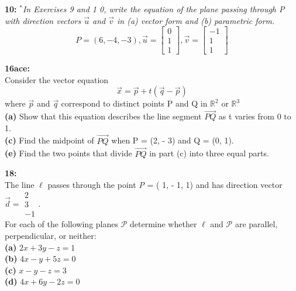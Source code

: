 \documentclass[12pt,letterpaper]{hmcpset}
\begin{document}
\vspace{180pt}
\pagebreak

\begin{problem}
\textbf{10:} \textit{$^*$In Exercises 9 and 1 0, write the equation of the plane passing
through P with direction vectors $\vec{u}$ and $\vec{v}$ in (a) vector
form and (b) parametric form.} \\
\[ P = (6,-4,-3), \vec{u} = \begin{bmatrix} 0\\1\\1 \end{bmatrix}, \vec{v} = \begin{bmatrix} -1\\1\\1 \end{bmatrix} \]
\end{problem}



\pagebreak

\begin{problem}
\textbf{16ace:}\\
Consider the vector equation \[\vec{x} = \vec{p} + t(\vec{q} - \vec{p})\]where
$\vec{p}$ and $\vec{q}$ correspond to distinct points P and Q in $\mathbb{R}^2$ or $\mathbb{R}^3$ \\
\textbf{(a)} Show that this equation describes the line segment $\vec{PQ}$ as t varies from 0 to 1. \\
\textbf{(c)} Find the midpoint of $\vec{PQ}$ when P = (2, - 3) and Q = (0, 1).  \\
\textbf{(e)} Find the two points that divide $\vec{PQ}$ in part (c) into three equal parts. \\
\end{problem}


\vspace{180pt}
\pagebreak

\begin{problem}
\textbf{18:}\\
The line $\ell$ passes through the point \textit{P} = ( 1, - 1, 1) and
has direction vector $\vec{d} = \begin{matrix}2\\3\\-1\end{matrix}$.\\ For each of the following planes $\mathcal{P}$ determine whether $\ell$ and  $\mathcal{P}$ are parallel, perpendicular, or neither:  \\
\textbf{(a)} $ 2x + 3y  - z = 1$ \\
\textbf{(b)} $ 4x - y + 5z = 0$ \\
\textbf{(c)} $ x - y -z = 3$ \\
\textbf{(d)} $ 4x + 6y - 2z = 0$ \\
\end{problem}
\end{document}
